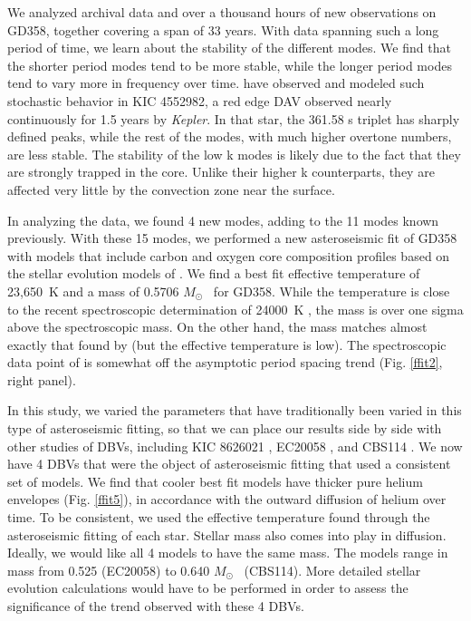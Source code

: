 \documentclass[12pt,preprint]{aastex}
\newcommand{\msun}{$M_\odot$}
\begin{document}
We analyzed archival data and over a thousand hours of new observations on GD358, together covering a 
span of 33 years. With data spanning such a long period of time, we learn about the stability of the
different modes. We find that the shorter period modes tend to be more stable, while the longer period 
modes tend to vary more in frequency over time. \citet{Bell15} have observed and modeled such stochastic 
behavior in KIC 4552982, a red edge DAV observed nearly continuously for 1.5 years by \emph{Kepler}. 
In that star, the 361.58 s triplet has sharply defined peaks, while the rest of the modes, with much 
higher overtone numbers, are less stable. The stability of the low k modes is likely due to the fact 
that they are strongly trapped in the core. Unlike their higher k counterparts, they are affected very 
little by the convection zone near the surface.

In analyzing the data, we found 4 new modes, adding to the 11 modes known previously. With these 15 modes, 
we performed a new asteroseismic fit of GD358 with models that include carbon and oxygen core composition 
profiles based on the stellar evolution models of \citet{Salaris97}. We find a best fit effective temperature 
of 23,650~K and a mass of 0.5706 \msun ~ for GD358. While the temperature is close to the recent spectroscopic 
determination of 24000~K \citep{Koester2013}, the mass is over one sigma above the spectroscopic mass. On the 
other hand, the mass matches almost exactly that found by \citet{Bergeron2011} (but the effective 
temperature is low). The spectroscopic data point of \citet{Koester2013} is somewhat off the asymptotic 
period spacing trend (Fig. \ref{ffit2}, right panel).

In this study, we varied the parameters that have traditionally been varied in this type of 
asteroseismic fitting, so that we can place our results side by side with other studies of 
DBVs, including KIC 8626021 \citep{Bischoff-Kim14}, EC20058 \citep{Bischoff-Kim11a}, and 
CBS114 \citep{Metcalfe05a}. We now have 4 DBVs that were the object of asteroseismic fitting 
that used a consistent set of models. We find that cooler best fit models have thicker pure 
helium envelopes (Fig. \ref{ffit5}), in accordance with the outward diffusion of helium over time. 
To be consistent, we used the effective temperature found through the asteroseismic fitting of each 
star. Stellar mass also comes into play in diffusion. Ideally, we would like all 4 models to have 
the same mass. The models range in mass from 0.525 (EC20058) to 0.640 \msun ~ (CBS114). More detailed 
stellar evolution calculations would have to be performed in order to assess the significance of the 
trend observed with these 4 DBVs.
\end{document}
